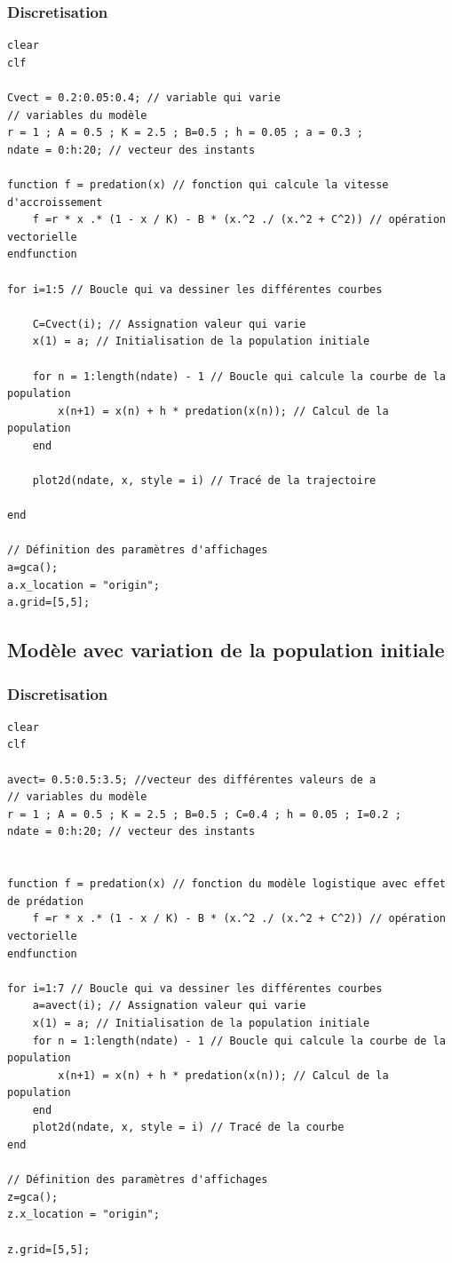 \documentclass{article}
\begin{document}
\subsubsection{Discretisation}

\begin{verbatim}
clear
clf

Cvect = 0.2:0.05:0.4; // variable qui varie
// variables du modèle
r = 1 ; A = 0.5 ; K = 2.5 ; B=0.5 ; h = 0.05 ; a = 0.3 ;
ndate = 0:h:20; // vecteur des instants

function f = predation(x) // fonction qui calcule la vitesse d'accroissement
    f =r * x .* (1 - x / K) - B * (x.^2 ./ (x.^2 + C^2)) // opération vectorielle
endfunction

for i=1:5 // Boucle qui va dessiner les différentes courbes
    
    C=Cvect(i); // Assignation valeur qui varie
    x(1) = a; // Initialisation de la population initiale
    
    for n = 1:length(ndate) - 1 // Boucle qui calcule la courbe de la population
        x(n+1) = x(n) + h * predation(x(n)); // Calcul de la population
    end
    
    plot2d(ndate, x, style = i) // Tracé de la trajectoire

end

// Définition des paramètres d'affichages
a=gca();
a.x_location = "origin";
a.grid=[5,5];
\end{verbatim}

\subsection{Modèle avec variation de la population initiale}

\subsubsection{Discretisation}

\begin{verbatim}
clear
clf

avect= 0.5:0.5:3.5; //vecteur des différentes valeurs de a
// variables du modèle
r = 1 ; A = 0.5 ; K = 2.5 ; B=0.5 ; C=0.4 ; h = 0.05 ; I=0.2 ;
ndate = 0:h:20; // vecteur des instants


function f = predation(x) // fonction du modèle logistique avec effet de prédation
    f =r * x .* (1 - x / K) - B * (x.^2 ./ (x.^2 + C^2)) // opération vectorielle
endfunction

for i=1:7 // Boucle qui va dessiner les différentes courbes
    a=avect(i); // Assignation valeur qui varie
    x(1) = a; // Initialisation de la population initiale
    for n = 1:length(ndate) - 1 // Boucle qui calcule la courbe de la population
        x(n+1) = x(n) + h * predation(x(n)); // Calcul de la population
    end
    plot2d(ndate, x, style = i) // Tracé de la courbe
end

// Définition des paramètres d'affichages
z=gca();
z.x_location = "origin";

z.grid=[5,5];
\end{verbatim}
\end{document}
